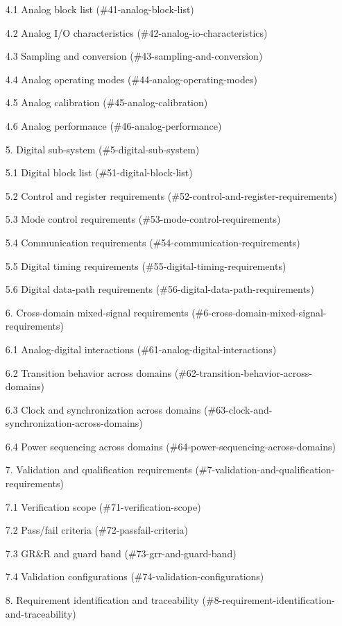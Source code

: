 \documentclass[11pt]{article}
\begin{document}
\begin{itemize}
\item [4.1 Analog block list](\#41-analog-block-list)
\item [4.2 Analog I/O characteristics](\#42-analog-io-characteristics)
\item [4.3 Sampling and conversion](\#43-sampling-and-conversion)
\item [4.4 Analog operating modes](\#44-analog-operating-modes)
\item [4.5 Analog calibration](\#45-analog-calibration)
\item [4.6 Analog performance](\#46-analog-performance)
\item [5. Digital sub-system](\#5-digital-sub-system)
\item [5.1 Digital block list](\#51-digital-block-list)
\item [5.2 Control and register requirements](\#52-control-and-register-requirements)
\item [5.3 Mode control requirements](\#53-mode-control-requirements)
\item [5.4 Communication requirements](\#54-communication-requirements)
\item [5.5 Digital timing requirements](\#55-digital-timing-requirements)
\item [5.6 Digital data-path requirements](\#56-digital-data-path-requirements)
\item [6. Cross-domain mixed-signal requirements](\#6-cross-domain-mixed-signal-requirements)
\item [6.1 Analog-digital interactions](\#61-analog-digital-interactions)
\item [6.2 Transition behavior across domains](\#62-transition-behavior-across-domains)
\item [6.3 Clock and synchronization across domains](\#63-clock-and-synchronization-across-domains)
\item [6.4 Power sequencing across domains](\#64-power-sequencing-across-domains)
\item [7. Validation and qualification requirements](\#7-validation-and-qualification-requirements)
\item [7.1 Verification scope](\#71-verification-scope)
\item [7.2 Pass/fail criteria](\#72-passfail-criteria)
\item [7.3 GR\&R and guard band](\#73-grr-and-guard-band)
\item [7.4 Validation configurations](\#74-validation-configurations)
\item [8. Requirement identification and traceability](\#8-requirement-identification-and-traceability)

\end{itemize}
\end{document}
